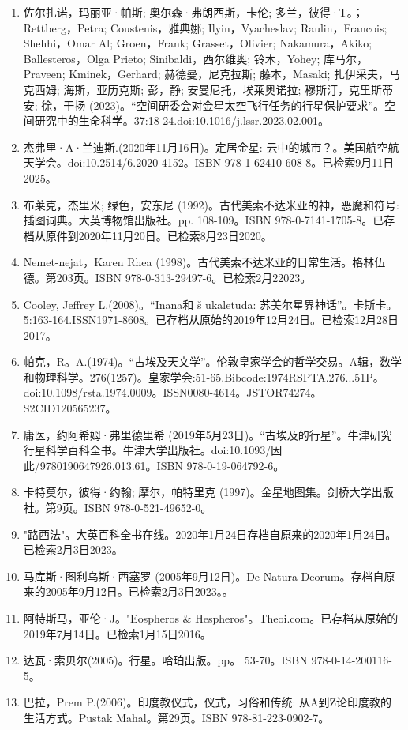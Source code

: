 \begin{enumerate}
\item 佐尔扎诺，玛丽亚·帕斯; 奥尔森·弗朗西斯，卡伦; 多兰，彼得·T。；Rettberg，Petra; Coustenis，雅典娜; Ilyin，Vyacheslav; Raulin，Francois; Shehhi，Omar Al; Groen，Frank; Grasset，Olivier; Nakamura，Akiko; Ballesteros，Olga Prieto; Sinibaldi，西尔维奥; 铃木，Yohey; 库马尔，Praveen; Kminek，Gerhard; 赫德曼，尼克拉斯; 藤本，Masaki; 扎伊采夫，马克西姆; 海斯，亚历克斯; 彭，静; 安曼尼托，埃莱奥诺拉; 穆斯汀，克里斯蒂安; 徐，干扬 (2023)。“空间研委会对金星太空飞行任务的行星保护要求”。空间研究中的生命科学。37:18-24.doi:10.1016/j.lssr.2023.02.001。
\item 杰弗里·A·兰迪斯.(2020年11月16日)。定居金星: 云中的城市？。美国航空航天学会。doi:10.2514/6.2020-4152。ISBN 978-1-62410-608-8。已检索9月11日2025。
\item 布莱克，杰里米; 绿色，安东尼 (1992)。古代美索不达米亚的神，恶魔和符号: 插图词典。大英博物馆出版社。pp. 108-109。ISBN 978-0-7141-1705-8。已存档从原件到2020年11月20日。已检索8月23日2020。
\item Nemet-nejat，Karen Rhea (1998)。古代美索不达米亚的日常生活。格林伍德。第203页。ISBN 978-0-313-29497-6。已检索2月22023。
\item Cooley, Jeffrey L.(2008)。“Inana和 š ukaletuda: 苏美尔星界神话”。卡斯卡。5:163-164.ISSN1971-8608。已存档从原始的2019年12月24日。已检索12月28日2017。 
\item 帕克，R。A.(1974)。“古埃及天文学”。伦敦皇家学会的哲学交易。A辑，数学和物理科学。276(1257)。皇家学会:51-65.Bibcode:1974RSPTA.276...51P。doi:10.1098/rsta.1974.0009。ISSN0080-4614。JSTOR74274。S2CID120565237。   
\item 庸医，约阿希姆·弗里德里希 (2019年5月23日)。“古埃及的行星”。牛津研究行星科学百科全书。牛津大学出版社。doi:10.1093/因此/9780190647926.013.61。ISBN 978-0-19-064792-6。
\item 卡特莫尔，彼得·约翰; 摩尔，帕特里克 (1997)。金星地图集。剑桥大学出版社。第9页。ISBN 978-0-521-49652-0。
\item "路西法"。大英百科全书在线。2020年1月24日存档自原来的2020年1月24日。已检索2月3日2023。
\item 马库斯·图利乌斯·西塞罗 (2005年9月12日)。De Natura Deorum。存档自原来的2005年9月12日。已检索2月3日2023。。
\item 阿特斯马，亚伦·J。"Eospheros & Hespheros"。Theoi.com。已存档从原始的2019年7月14日。已检索1月15日2016。
\item 达瓦·索贝尔(2005)。行星。哈珀出版。pp。 53-70。ISBN 978-0-14-200116-5。
\item 巴拉，Prem P.(2006)。印度教仪式，仪式，习俗和传统: 从A到Z论印度教的生活方式。Pustak Mahal。第29页。ISBN 978-81-223-0902-7。

\end{enumerate}
